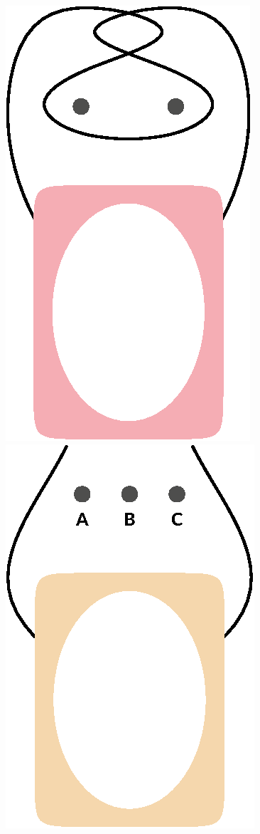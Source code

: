 {    \bigskip\noindent
    \includegraphics[scale=0.5]{figures/ponder_national_picturehang_03.eps}
    \hfill
    \includegraphics[scale=0.5]{figures/ponder_national_picturehang_04.eps}
}

